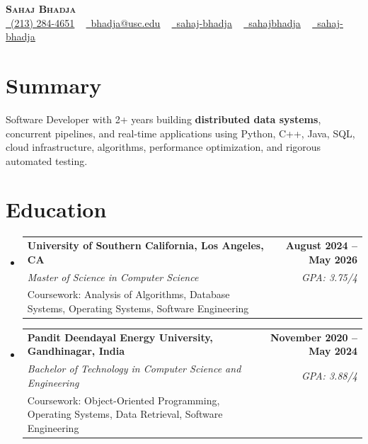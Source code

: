 \documentclass[letterpaper,10pt]{article}
\makeatletter
\newcommand{\sectionGap}{\vspace{-8pt}}
\newcommand{\resumeEduSubheading}[5]{\vspace{-1pt}\item\begin{tabular*}{1.0\textwidth}[t]{l@{\extracolsep{\fill}}r}\textbf{#1} & \textbf{\small #2} \\\textit{\small #3} & \textit{\small #4} \\\small #5 & \\\end{tabular*}\vspace{-4pt}}
\newcommand{\resumeSubHeadingListStart}{\begin{itemize}[leftmargin=0.0in, label={}]}
\newcommand{\resumeSubHeadingListEnd}{\end{itemize}}
\makeatother
\begin{document}
\begin{center}
{\Huge \scshape \textbf{Sahaj Bhadja}} \\ \vspace{1pt}
\small \href{tel:2132844651}{\faPhone\ \underline{(213) 284-4651}} ~ \href{mailto:bhadja@usc.edu}{\raisebox{-0.2\height}\faEnvelope\ \underline{bhadja@usc.edu}} ~
\href{https://www.linkedin.com/in/sahaj-bhadja/}{\raisebox{-0.2\height}\faLinkedin\ \underline{sahaj-bhadja}} ~ \href{https://github.com/SAHAJ-BHADJA}{\raisebox{-0.2\height}\faGithub\ \underline{sahajbhadja}} ~
\href{https://sahaj-bhadja.vercel.app/}{\raisebox{-0.2\height}\faGlobe\ \underline{sahaj-bhadja}}
\end{center}
\vspace{-16pt}
\section{Summary}
\begin{itemize}[leftmargin=0.15in, label={}]
\small{\item{Software Developer with 2+ years building \textbf{distributed data systems}, concurrent pipelines, and real-time applications using Python, C++, Java, SQL, cloud infrastructure, algorithms, performance optimization, and rigorous automated testing.}}
\end{itemize}
\sectionGap
\section{Education}
\resumeSubHeadingListStart
\resumeEduSubheading{University of Southern California, Los Angeles, CA}{August 2024 -- May 2026}{Master of Science in Computer Science}{GPA: 3.75/4}{Coursework: Analysis of Algorithms, Database Systems, Operating Systems, Software Engineering}
\resumeEduSubheading{Pandit Deendayal Energy University, Gandhinagar, India}{November 2020 -- May 2024}{Bachelor of Technology in Computer Science and Engineering}{GPA: 3.88/4}{Coursework: Object-Oriented Programming, Operating Systems, Data Retrieval, Software Engineering}
\resumeSubHeadingListEnd
\sectionGap
\end{document}
